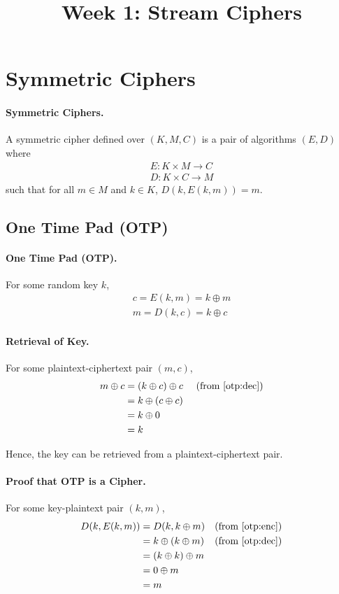\documentclass{article}
\begin{document}
\title{Week 1: Stream Ciphers}

\section{Symmetric Ciphers}

\paragraph{Symmetric Ciphers.} A symmetric cipher defined over $(K, M, C)$ is a pair of algorithms $(E, D)$ where \begin{gather*}
  E: K \times M \rightarrow C \\
  D: K \times C \rightarrow M
\end{gather*} such that for all $m \in M$ and $k \in K$, $D(k, E(k, m)) = m$.

\subsection{One Time Pad (OTP)}

\paragraph{One Time Pad (OTP).} For some random key $k$, \begin{gather}
  c = E(k, m) = k \oplus m \label{otp:enc} \\
  m = D(k, c) = k \oplus c \label{otp:dec}
\end{gather}

\paragraph{Retrieval of Key.} For some plaintext-ciphertext pair $(m, c)$, \begin{align*}
  m \oplus c &= (k \oplus c) \oplus c &&\text{ (from \eqref{otp:dec})} \\
            &= k \oplus (c \oplus c) \\
            &= k \oplus 0 \\
            &= k
\end{align*}

Hence, the key can be retrieved from a plaintext-ciphertext pair.

\paragraph{Proof that OTP is a Cipher.} For some key-plaintext pair $(k, m)$, \begin{align*}
  D(k, E(k, m)) &= D(k, k \oplus m) &&\text{(from \eqref{otp:enc})}\\
                &= k \oplus (k \oplus m) &&\text{(from \eqref{otp:dec})}\\
                &= (k \oplus k) \oplus m \\
                &= 0 \oplus m \\
                &= m
\end{align*}
\end{document}
